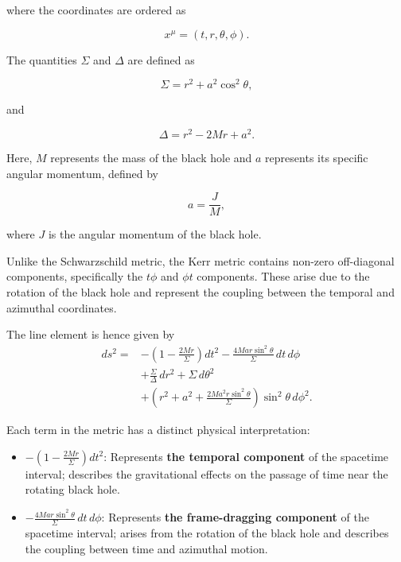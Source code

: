 \documentclass[12pt]{article}
\begin{document}
\begin{itemize}
where the coordinates are ordered as

\begin{equation}
x^\mu=(t,r,\theta,\phi).
\end{equation}

The quantities $\Sigma$ and $\Delta$ are defined as

\begin{equation}
\Sigma=r^2+a^2\cos^2\theta,
\end{equation}

and

\begin{equation}
\Delta=r^2-2Mr+a^2.
\end{equation}

Here, $M$ represents the mass of the black hole and $a$ represents its specific angular momentum, defined by

\begin{equation}
a=\frac{J}{M},
\end{equation}

where $J$ is the angular momentum of the black hole.

Unlike the Schwarzschild metric, the Kerr metric contains non-zero off-diagonal components, specifically the $t\phi$ and $\phi t$ components. These arise due to the rotation of the black hole and represent the coupling between the temporal and azimuthal coordinates.

The line element is hence given by
\begin{equation}
\begin{aligned}
ds^2 ={}&
-\left(1-\frac{2Mr}{\Sigma}\right)dt^2
-\frac{4Mar\sin^2\theta}{\Sigma}\,dt\,d\phi
\\
&+\frac{\Sigma}{\Delta}\,dr^2
+\Sigma\,d\theta^2
\\
&+\left(
r^2+a^2+
\frac{2Ma^2r\sin^2\theta}{\Sigma}
\right)
\sin^2\theta\,d\phi^2.
\end{aligned}
\end{equation}

Each term in the metric has a distinct physical interpretation:


\begin{itemize}

\item[$\bullet$] $\displaystyle -\left(1-\frac{2Mr}{\Sigma}\right)dt^2$: Represents \textbf{the temporal component} of the spacetime interval; describes the gravitational effects on the passage of time near the rotating black hole.

\item[$\bullet$] $\displaystyle -\frac{4Mar\sin^2\theta}{\Sigma}\,dt\,d\phi$: Represents \textbf{the frame-dragging component} of the spacetime interval; arises from the rotation of the black hole and describes the coupling between time and azimuthal motion.


\end{itemize}
\end{itemize}
\end{document}
